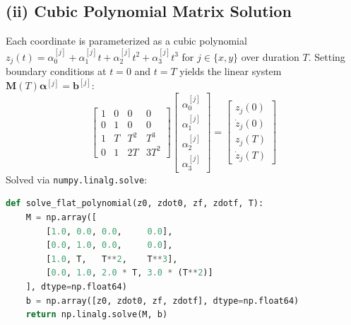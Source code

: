 \documentclass[10pt,a4paper]{article}
\begin{document}
\subsection*{(ii) Cubic Polynomial Matrix Solution}
Each coordinate is parameterized as a cubic polynomial $z_j(t) = \alpha_0^{[j]} + \alpha_1^{[j]}t + \alpha_2^{[j]}t^2 + \alpha_3^{[j]}t^3$ for $j \in \{x, y\}$ over duration $T$. Setting boundary conditions at $t = 0$ and $t = T$ yields the linear system $\mathbf{M}(T)\boldsymbol{\alpha}^{[j]} = \mathbf{b}^{[j]}$:
\begin{equation}
    \begin{bmatrix}
        1 & 0 & 0 & 0 \\
        0 & 1 & 0 & 0 \\
        1 & T & T^2 & T^3 \\
        0 & 1 & 2T & 3T^2
    \end{bmatrix}
    \begin{bmatrix}
        \alpha_0^{[j]} \\ \alpha_1^{[j]} \\ \alpha_2^{[j]} \\ \alpha_3^{[j]}
    \end{bmatrix}
    =
    \begin{bmatrix}
        z_j(0) \\ \dot{z}_j(0) \\ z_j(T) \\ \dot{z}_j(T)
    \end{bmatrix}
\end{equation}
Solved via \texttt{numpy.linalg.solve}:
\begin{lstlisting}[language=Python]
def solve_flat_polynomial(z0, zdot0, zf, zdotf, T):
    M = np.array([
        [1.0, 0.0, 0.0,     0.0],
        [0.0, 1.0, 0.0,     0.0],
        [1.0, T,   T**2,    T**3],
        [0.0, 1.0, 2.0 * T, 3.0 * (T**2)]
    ], dtype=np.float64)
    b = np.array([z0, zdot0, zf, zdotf], dtype=np.float64)
    return np.linalg.solve(M, b)
\end{lstlisting}
\end{document}
